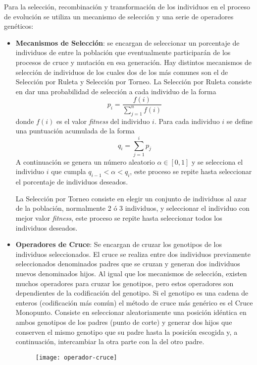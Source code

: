 Para la selección, recombinación y transformación de los individuos en el proceso de evolución se utiliza un mecanismo de selección y una serie de operadores genéticos\cite{cervigon09}:

\begin{itemize}
\item \textbf{Mecanismos de Selección}: se encargan  de seleccionar un porcentaje de individuos de entre la población que eventualmente participarán de los procesos de cruce y mutación en esa generación. Hay distintos mecanismos de selección de individuos de los cuales dos de los más comunes son el de Selección por Ruleta y Selección por Torneo. La Selección por Ruleta consiste en dar una probabilidad de selección a cada individuo de la forma
\begin{equation}
p_i = \frac{f(i)}{\sum\limits_{j=1}^n f(i)}
\end{equation}
donde $f(i)$ es el valor \textit{fitness} del individuo $i$. Para cada individuo $i$ se define una puntuación acumulada de la forma
\begin{equation}
q_i = \sum\limits_{j=1}^i p_j
\end{equation}
A continuación se genera un número aleatorio $\alpha \in [0,1]$ y se selecciona el individuo $i$ que cumpla $q_{i-1} < \alpha < q_i$, este proceso se repite hasta seleccionar el porcentaje de individuos deseados. 

La Selección por Torneo consiste en elegir un conjunto de individuos al azar de la población, normalmente 2 ó 3 individuos, y seleccionar el individuo con mejor valor \textit{fitness}, este proceso se repite hasta seleccionar todos los individuos deseados.

\item \textbf{Operadores de Cruce}: Se encargan de cruzar los genotipos de los individuos seleccionados. El cruce se realiza entre dos individuos previamente seleccionados denominados padres que se cruzan y generan dos individuos nuevos denominados hijos. Al igual que los mecanismos de selección, existen muchos operadores  para cruzar los genotipos, pero estos operadores son dependientes de la codificación del genotipo. Si el genotipo es una cadena de enteros (codificación más común) el método de cruce más genérico es el Cruce Monopunto. Consiste en seleccionar aleatoriamente una posición idéntica en ambos genotipos de los padres (punto de corte) y generar dos hijos que conserven el mismo genotipo que su padre hasta la posición escogida y, a continuación, intercambiar la otra parte con la del otro padre.
\begin{figure}[H]
\centering
\texttt{[image: operador-cruce]}
\end{figure}


\end{itemize}
